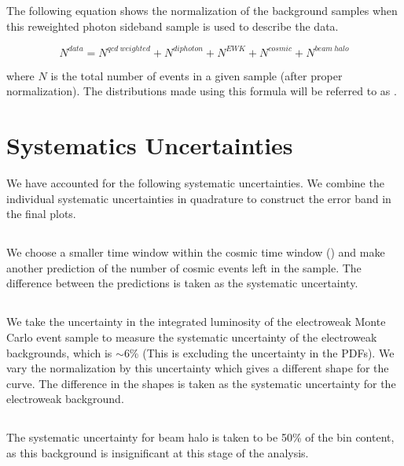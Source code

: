 \documentclass[11pt]{article}
\begin{document}
The following equation shows the normalization of the background samples when this reweighted photon sideband sample is used to describe the data.

\begin{equation}
 N^{data} = N^{qcd~weighted}+N^{diphoton}+N^{EWK}+N^{cosmic}+N^{beam~halo}
\end{equation}

where $N$ is the total number of events in a given sample (after proper normalization). The distributions made using this formula will be referred to as .


\section{Systematics Uncertainties}

We have accounted for the following systematic uncertainties. We combine the individual systematic uncertainties in quadrature to construct the error band in the final plots.

\subsection{\cosmicjets}
We choose a smaller time window within the cosmic time window (\cosmictimewindow) and make another prediction of the number of cosmic events left in the sample. The difference between the predictions is taken as the systematic uncertainty.

\subsection{\elejets}
We take the uncertainty in the integrated luminosity of the electroweak Monte Carlo event sample to measure the systematic uncertainty of the electroweak backgrounds, which is $\sim$6\% (This is excluding the uncertainty in the PDFs). We vary the normalization by this uncertainty which gives a different shape for the curve. The difference in the shapes is taken as the systematic uncertainty for the electroweak background.

\subsection{\halojets}
The systematic uncertainty for beam halo is taken to be 50\%  of the bin content, as this background is insignificant at this stage of the analysis.
\end{document}
